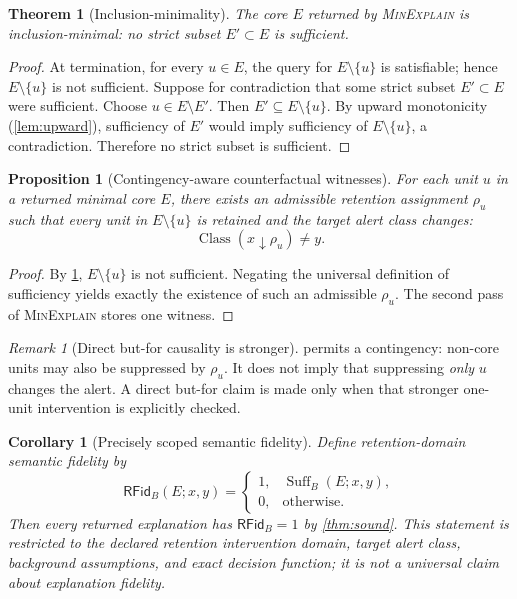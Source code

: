 \documentclass[11pt]{article}
\newtheorem{theorem}{Theorem}[section]
\newtheorem{proposition}{Proposition}[section]
\newtheorem{corollary}{Corollary}[section]
\theoremstyle{remark}
\newtheorem{remark}{Remark}[section]
\newcommand{\Class}{\operatorname{Class}}
\newcommand{\Suff}{\operatorname{Suff}}
\begin{document}
\begin{theorem}[Inclusion-minimality]\label{thm:min}
The core $E$ returned by \textsc{MinExplain} is inclusion-minimal: no strict subset $E'\subset E$ is sufficient.
\end{theorem}
\begin{proof}
At termination, for every $u\in E$, the query for $E\setminus\{u\}$ is satisfiable; hence $E\setminus\{u\}$ is not sufficient. Suppose for contradiction that some strict subset $E'\subset E$ were sufficient. Choose $u\in E\setminus E'$. Then $E'\subseteq E\setminus\{u\}$. By upward monotonicity (\cref{lem:upward}), sufficiency of $E'$ would imply sufficiency of $E\setminus\{u\}$, a contradiction. Therefore no strict subset is sufficient.
\end{proof}

\begin{proposition}[Contingency-aware counterfactual witnesses]\label{prop:witness}
For each unit $u$ in a returned minimal core $E$, there exists an admissible retention assignment $\rho_u$ such that every unit in $E\setminus\{u\}$ is retained and the target alert class changes:
\[
\Class(x\downarrow\rho_u)\neq y.
\]
\end{proposition}
\begin{proof}
By \cref{thm:min}, $E\setminus\{u\}$ is not sufficient. Negating the universal definition of sufficiency yields exactly the existence of such an admissible $\rho_u$. The second pass of \textsc{MinExplain} stores one witness.
\end{proof}

\begin{remark}[Direct but-for causality is stronger]
 permits a contingency: non-core units may also be suppressed by $\rho_u$. It does not imply that suppressing \emph{only} $u$ changes the alert. A direct but-for claim is made only when that stronger one-unit intervention is explicitly checked.
\end{remark}

\begin{corollary}[Precisely scoped semantic fidelity]\label{cor:fidelity}
Define retention-domain semantic fidelity by
\[
\mathsf{RFid}_B(E;x,y)=
\begin{cases}
1,&\Suff_B(E;x,y),\\
0,&\text{otherwise}.
\end{cases}
\]
Then every returned explanation has $\mathsf{RFid}_B=1$ by \cref{thm:sound}. This statement is restricted to the declared retention intervention domain, target alert class, background assumptions, and exact decision function; it is not a universal claim about explanation fidelity.
\end{corollary}
\end{document}
